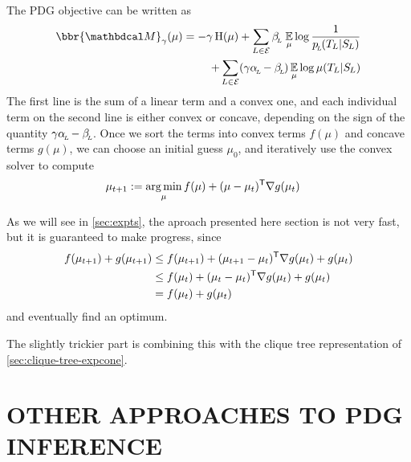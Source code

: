 \documentclass[twoside]{article}
\begin{document}
The PDG objective can be written as \parencite[Proposition 4.6]{pdg-aaai}
\begin{align*}
    \bbr{\dg M}_\gamma(\mu) = 
        -\gamma\H(\mu) + 
            \sum_{L \in \Ed}
                \beta\ssub L\, \Ex_\mu 
                    \log \frac1{p\ssub L(\Tgt L | \Src L)}
                \\
            + \sum_{L \in \Ed}
            (\gamma \alpha \ssub L - \beta\ssub L)
                \Ex_\mu \log \mu(\Tgt L | \Src L)
\end{align*}
The first line is the sum of a linear term and a convex one,
and each individual term on the second line is either convex or concave, depending on the sign of the quantity $\gamma \alpha_{\!_{L}\!} - \beta_{\!_{L}\!}$. 
Once we sort the terms into convex terms $f(\mu)$ and concave terms
$g(\mu)$, we can choose an initial guess $\mu_0$, and iteratively use
the convex solver to compute 
%
\begin{align*}
    \mu_{t+1} &:= \operatorname*{arg\,min}_{\mu} f(\mu) + (\mu - \mu_{t})^{\sf T}
        \nabla g(\mu_t)
\end{align*}

As we will see in \cref{sec:expts}, the aproach presented here section is 
not very fast, but it is guaranteed to make progress, since
\begin{align*}
    f(\mu_{t+1}) + g(\mu_{t+1}) &\le  f(\mu_{t+1}) + (\mu_{t+1}-\mu_t)^{\sf T} \nabla g(\mu_t) + g(\mu_t)
        \\
    &\le  f(\mu_t) + (\mu_t - \mu_{t})^{\sf T}\nabla g(\mu_t)  + g(\mu_t)
        \\
    &= f(\mu_t) + g(\mu_t)
\end{align*}
and eventually find an optimum. 

The slightly trickier part is combining this with the clique tree representation of \cref{sec:clique-tree-expcone}.

        
\section{OTHER APPROACHES TO PDG INFERENCE} \label{sec:other-inference}
\end{document}
